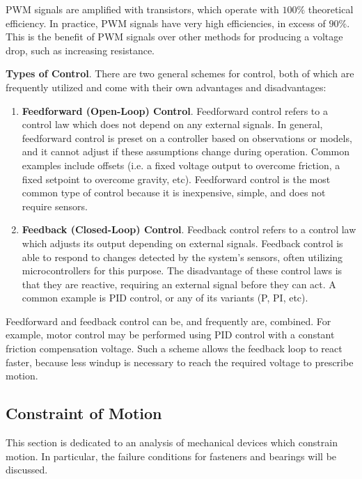 PWM signals are amplified with transistors, which operate with $100\%$ theoretical efficiency. In practice, PWM signals have very high efficiencies, in excess of $90\%$. This is the benefit of PWM signals over other methods for producing a voltage drop, such as increasing resistance.

\begin{shaded}
    \textbf{Types of Control}. There are two general schemes for control, both of which are frequently utilized and come with their own advantages and disadvantages:
    \begin{enumerate}
        \item[] \textbf{Feedforward (Open-Loop) Control}. Feedforward control refers to a control law which does not depend on any external signals. In general, feedforward control is preset on a controller based on observations or models, and it cannot adjust if these assumptions change during operation. Common examples include offsets (i.e. a fixed voltage output to overcome friction, a fixed setpoint to overcome gravity, etc). Feedforward control is the most common type of control because it is inexpensive, simple, and does not require sensors.
        \item[] \textbf{Feedback (Closed-Loop) Control}. Feedback control refers to a control law which adjusts its output depending on external signals. Feedback control is able to respond to changes detected by the system's sensors, often utilizing microcontrollers for this purpose. The disadvantage of these control laws is that they are reactive, requiring an external signal before they can act. A common example is PID control, or any of its variants (P, PI, etc).
    \end{enumerate}
    Feedforward and feedback control can be, and frequently are, combined. For example, motor control may be performed using PID control with a constant friction compensation voltage. Such a scheme allows the feedback loop to react faster, because less windup is necessary to reach the required voltage to prescribe motion.
\end{shaded}

\subsection{Constraint of Motion}

This section is dedicated to an analysis of mechanical devices which constrain motion. In particular, the failure conditions for fasteners and bearings will be discussed.

